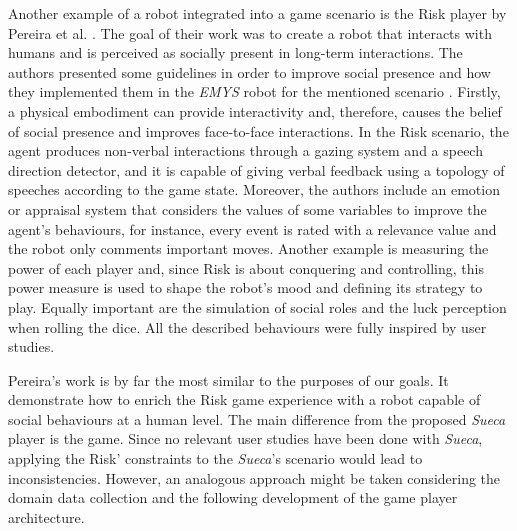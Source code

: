 Another example of a robot integrated into a game scenario is the Risk player by Pereira et al. \cite{Lisboa}.
The goal of their work was to create a robot that interacts with humans and is perceived as socially present in long-term interactions.
The authors presented some guidelines in order to improve social presence and how they implemented them in the \emph{EMYS} robot for the mentioned scenario \cite{Pereira}.
Firstly, a physical embodiment can provide interactivity and, therefore, causes the belief of social presence and improves face-to-face interactions.
In the Risk scenario, the agent produces non-verbal interactions through a gazing system and a speech direction detector, and it is capable of giving verbal feedback using a topology of speeches according to the game state.
Moreover, the authors include an emotion or appraisal system that considers the values of some variables to improve the agent's behaviours, for instance, every event is rated with a relevance value and the robot only comments important moves.
Another example is measuring the power of each player and, since Risk is about conquering and controlling, this power measure is used to shape the robot's mood and defining its strategy to play.
Equally important are the simulation of social roles and the luck perception when rolling the dice.
All the described behaviours were fully inspired by user studies.

Pereira's work is by far the most similar to the purposes of our goals.
It demonstrate how to enrich the Risk game experience with a robot capable of social behaviours at a human level.
The main difference from the proposed \emph{Sueca} player is the game.
Since no relevant user studies have been done with \emph{Sueca}, applying the Risk' constraints to the \emph{Sueca}'s scenario would lead to inconsistencies.
However, an analogous approach might be taken considering the domain data collection and the following development of the game player architecture. 

